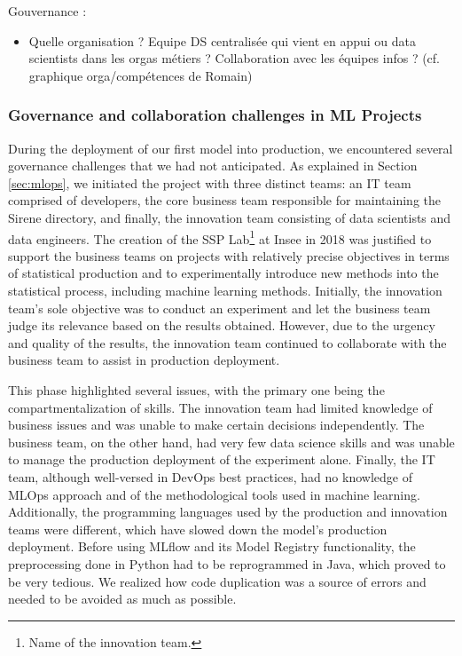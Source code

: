     \item Gouvernance :
    \begin{itemize}
        \item Quelle organisation ? Equipe DS centralisée qui vient en appui ou data scientists dans les orgas métiers ? Collaboration avec les équipes infos ? (cf. graphique orga/compétences de Romain)
    \end{itemize}


\subsubsection{Governance and collaboration challenges in ML Projects}

During the deployment of our first model into production, we encountered several governance challenges that we had not anticipated. As explained in Section \ref{sec:mlops}, we initiated the project with three distinct teams: an IT team comprised of developers, the core business team responsible for maintaining the Sirene directory, and finally, the innovation team consisting of data scientists and data engineers. The creation of the SSP Lab\footnote{Name of the innovation team.} at Insee in 2018 was justified to support the business teams on projects with relatively precise objectives in terms of statistical production and to experimentally introduce new methods into the statistical process, including machine learning methods. Initially, the innovation team's sole objective was to conduct an experiment and let the business team judge its relevance based on the results obtained. However, due to the urgency and quality of the results, the innovation team continued to collaborate with the business team to assist in production deployment.

This phase highlighted several issues, with the primary one being the compartmentalization of skills. The innovation team had limited knowledge of business issues and was unable to make certain decisions independently. The business team, on the other hand, had very few data science skills and was unable to manage the production deployment of the experiment alone. Finally, the IT team, although well-versed in DevOps best practices, had no knowledge of MLOps approach and of the methodological tools used in machine learning. Additionally, the programming languages used by the production and innovation teams were different, which have slowed down the model's production deployment. Before using MLflow and its Model Registry functionality, the preprocessing done in Python had to be reprogrammed in Java, which proved to be very tedious. We realized how code duplication was a source of errors and needed to be avoided as much as possible.

